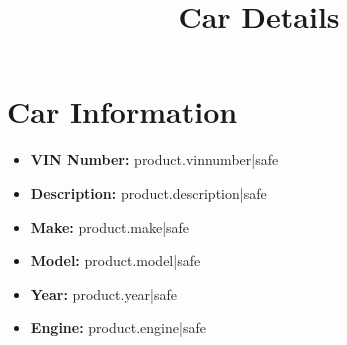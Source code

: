 \documentclass[12pt]{article}
\begin{document}
\title{Car Details}
\author{}
\date{}
\maketitle

\section*{Car Information}

\begin{itemize}
    \item \textbf{\large VIN Number:} {{ product.vinnumber|safe }}
    \item \textbf{\large Description:} {{ product.description|safe }}
    \item \textbf{\large Make:} {{ product.make|safe }}
    \item \textbf{\large Model:} {{ product.model|safe }}
    \item \textbf{\large Year:} {{ product.year|safe }}
    \item \textbf{\large Engine:} {{ product.engine|safe }}
\end{itemize}
\end{document}

